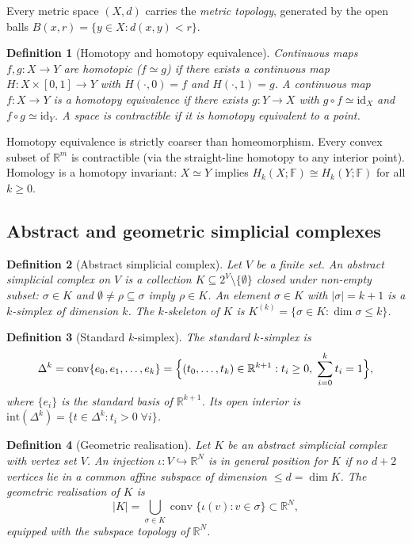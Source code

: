 \documentclass[onluarkali,ingilizce,yukseklisans,karton,LisansustuEgitim]{itutez}
\newtheorem{definition}{Definition}[chapter]
\DeclareMathOperator{\conv}{conv}
\providecommand{\R}{\mathbb{R}}
\providecommand{\F}{\mathbb{F}}
\providecommand{\1}{\mathbf{1}}
\begin{document}
Every metric space $(X,d)$ carries the \emph{metric topology}, generated by the open balls $B(x,r)=\{y\in X:d(x,y)<r\}$.

\begin{definition}[Homotopy and homotopy equivalence]
\label{def:homotopy}
Continuous maps $f,g\colon X\to Y$ are \emph{homotopic} ($f\simeq g$) if there exists a continuous map $H\colon X\times[0,1]\to Y$ with $H(\cdot,0)=f$ and $H(\cdot,1)=g$. A continuous map $f\colon X\to Y$ is a \emph{homotopy equivalence} if there exists $g\colon Y\to X$ with $g\circ f\simeq\mathrm{id}_X$ and $f\circ g\simeq\mathrm{id}_Y$. A space is \emph{contractible} if it is homotopy equivalent to a point.
\end{definition}

Homotopy equivalence is strictly coarser than homeomorphism. Every convex subset of $\R^m$ is contractible (via the straight-line homotopy to any interior point). Homology is a homotopy invariant: $X\simeq Y$ implies $H_k(X;\F)\cong H_k(Y;\F)$ for all $k\geq 0$.

\subsection{Abstract and geometric simplicial complexes}

\begin{definition}[Abstract simplicial complex]
\label{def:simplicial-abstract}
Let $V$ be a finite set. An \emph{abstract simplicial complex} on $V$ is a collection $K\subseteq 2^V\setminus\{\emptyset\}$ closed under non-empty subset: $\sigma\in K$ and $\emptyset\neq\rho\subseteq\sigma$ imply $\rho\in K$. An element $\sigma\in K$ with $|\sigma|=k+1$ is a \emph{$k$-simplex} of dimension $k$. The \emph{$k$-skeleton} of $K$ is $K^{(k)}=\{\sigma\in K:\dim\sigma\leq k\}$.
\end{definition}

\begin{definition}[Standard $k$-simplex]
\label{def:standard-simplex}
The \emph{standard $k$-simplex} is
\[
  \Delta^k=\conv\{e_0,e_1,\ldots,e_k\}
  =\Bigl\{(t_0,\ldots,t_k)\in\R^{k+1}:t_i\geq 0,\;\sum_{i=0}^kt_i=1\Bigr\},
\]
where $\{e_i\}$ is the standard basis of $\R^{k+1}$. Its open interior is $\mathrm{int}(\Delta^k)=\{t\in\Delta^k:t_i>0\;\forall i\}$.
\end{definition}

\begin{definition}[Geometric realisation]
\label{def:geo-real}
Let $K$ be an abstract simplicial complex with vertex set $V$. An injection $\iota\colon V\hookrightarrow\R^N$ is in \emph{general position} for $K$ if no $d+2$ vertices lie in a common affine subspace of dimension $\leq d=\dim K$. The \emph{geometric realisation} of $K$ is
\[
  |K|=\bigcup_{\sigma\in K}\conv\bigl\{\iota(v):v\in\sigma\bigr\}\subset\R^N,
\]
equipped with the subspace topology of $\R^N$.
\end{definition}
\end{document}
